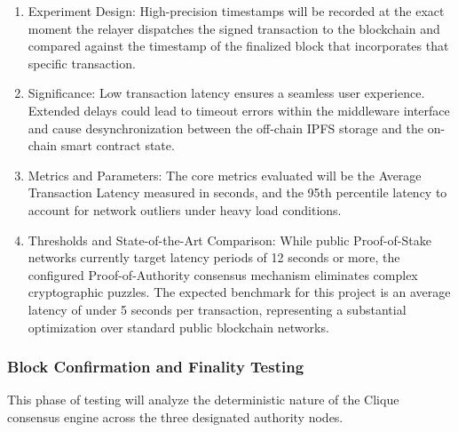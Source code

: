 \begin{enumerate}
    \item Experiment Design: High-precision timestamps will be recorded at the exact moment the relayer dispatches the signed transaction to the blockchain and compared against the timestamp of the finalized block that incorporates that specific transaction.
    \item Significance: Low transaction latency ensures a seamless user experience. Extended delays could lead to timeout errors within the middleware interface and cause desynchronization between the off-chain IPFS storage and the on-chain smart contract state.
    \item Metrics and Parameters: The core metrics evaluated will be the Average Transaction Latency measured in seconds, and the 95th percentile latency to account for network outliers under heavy load conditions.
    \item Thresholds and State-of-the-Art Comparison: While public Proof-of-Stake networks currently target latency periods of 12 seconds or more, the configured Proof-of-Authority consensus mechanism eliminates complex cryptographic puzzles. The expected benchmark for this project is an average latency of under 5 seconds per transaction, representing a substantial optimization over standard public blockchain networks.
\end{enumerate}

\subsubsection{Block Confirmation and Finality Testing}
This phase of testing will analyze the deterministic nature of the Clique consensus engine across the three designated authority nodes.

